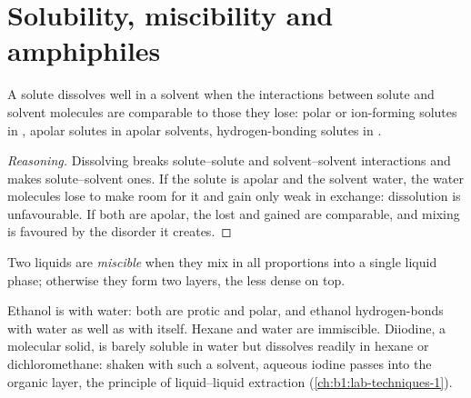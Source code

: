 \section{Solubility, miscibility and amphiphiles}

\begin{proposition}\label{prop:b1:intermolecular-forces-solvents:like}
A solute dissolves well in a solvent when the interactions between solute
and solvent molecules are comparable to those they lose: polar or
ion-forming solutes in , apolar solutes in apolar
solvents, hydrogen-bonding solutes in .
\end{proposition}

\begin{proof}[Reasoning]
Dissolving breaks solute--solute and solvent--solvent interactions and
makes solute--solvent ones. If the solute is apolar and the solvent water,
the water molecules lose  to make room for it and gain only
weak  in exchange: dissolution is unfavourable. If
both are apolar, the  lost and gained are comparable,
and mixing is favoured by the disorder it creates.
\end{proof}

\begin{definition}\label{def:b1:intermolecular-forces-solvents:miscibility}
Two liquids are \emph{miscible} when they mix in all
proportions into a single liquid phase; otherwise they form two layers,
the less dense on top.
\end{definition}

\begin{example}\label{ex:b1:intermolecular-forces-solvents:miscible}
Ethanol is  with water: both are protic and polar, and ethanol
hydrogen-bonds with water as well as with itself. Hexane and water are
immiscible. Diiodine, a molecular solid, is barely soluble in water but
dissolves readily in hexane or dichloromethane: shaken with such a
solvent, aqueous iodine passes into the organic layer, the principle of
liquid--liquid extraction (\cref{ch:b1:lab-techniques-1}).
\end{example}

